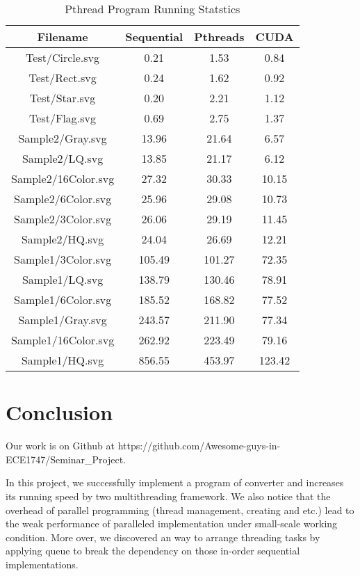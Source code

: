 \documentclass[10pt,twocolumn,letterpaper]{article}
\numberwithin{figure}{section}
\begin{document}
\begin{table*}[ht]\centering\begin{center}
\begin{tabular}{cccc}
Filename & Sequential & Pthreads & CUDA \\
\hline

Test/Circle.svg & 0.21 & 1.53 & 0.84\\
Test/Rect.svg & 0.24 & 1.62 & 0.92\\
Test/Star.svg & 0.20 & 2.21 & 1.12\\
Test/Flag.svg & 0.69 & 2.75 & 1.37\\
Sample2/Gray.svg & 13.96 & 21.64 & 6.57\\
Sample2/LQ.svg & 13.85 & 21.17 & 6.12\\
Sample2/16Color.svg & 27.32 & 30.33 & 10.15 \\
Sample2/6Color.svg & 25.96 & 29.08 &10.73\\
Sample2/3Color.svg & 26.06 & 29.19 & 11.45\\
Sample2/HQ.svg & 24.04 & 26.69 & 12.21\\
Sample1/3Color.svg & 105.49 & 101.27 & 72.35\\
Sample1/LQ.svg & 138.79 & 130.46 & 78.91\\
Sample1/6Color.svg & 185.52 & 168.82 & 77.52\\
Sample1/Gray.svg & 243.57 & 211.90 & 77.34\\
Sample1/16Color.svg & 262.92 & 223.49 & 79.16\\
Sample1/HQ.svg & 856.55 & 453.97 & 123.42\\
\hline
\end{tabular}\end{center}\caption{Pthread Program Running Statstics}\label{result table}
\end{table*}


\section{Conclusion}

Our work is on Github at https://github.com/Awesome-guys-in-ECE1747/Seminar\_Project.

In this project, we successfully implement a program of converter and increases its running speed by two multithreading framework. We also notice that the overhead of parallel programming (thread management, creating and etc.) lead to the weak performance of paralleled implementation under small-scale working condition. More over, we discovered an way to arrange threading tasks by applying queue to break the dependency on those in-order sequential implementations.
\end{document}
